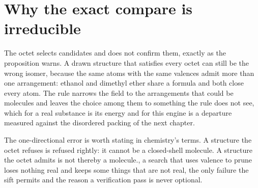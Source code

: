 \section{Why the exact compare is irreducible}

The octet selects candidates and does not confirm them, exactly as the proposition warns. A drawn
structure that satisfies every octet can still be the wrong isomer, because the same atoms with the
same valences admit more than one arrangement: ethanol and dimethyl ether share a formula and both
close every atom. The rule narrows the field to the arrangements that could be molecules and leaves
the choice among them to something the rule does not see, which for a real substance is its energy
and for this engine is a departure measured against the disordered packing of the next chapter.

The one-directional error is worth stating in chemistry's terms. A structure the octet refuses is
refused rightly: it cannot be a closed-shell molecule. A structure the octet admits is not thereby a
molecule., a search that uses valence to prune loses nothing real and keeps some things that are
not real, the only failure the sift permits and the reason a verification pass is never
optional.
